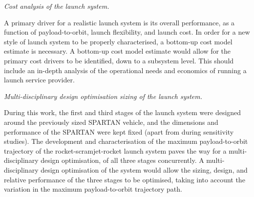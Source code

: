 \vspace{10pt}
 \textit{Cost analysis of the launch system.}

 \noindent
A primary driver for a realistic launch system is its overall performance, as a function of payload-to-orbit, launch flexibility, and launch cost. In order for a new style of launch system to be properly characterised, a bottom-up cost model estimate is necessary. A bottom-up cost model estimate would allow for the primary cost drivers to be identified, down to a subsystem level. This should include an in-depth analysis of the operational needs and economics of running a launch service provider.

\vspace{10pt}
 \textit{Multi-disciplinary design optimisation sizing of the launch system.}

 \noindent
During this work, the first and third stages of the launch system were designed around the previously sized SPARTAN vehicle, and the dimensions and performance of the SPARTAN were kept fixed (apart from during sensitivity studies).
The development and characterisation of the maximum payload-to-orbit trajectory of the rocket-scramjet-rocket launch system paves the way for a multi-disciplinary design optimisation, of all three stages concurrently. A multi-disciplinary design optimisation of the system would allow the sizing, design, and relative performance of the three stages to be optimised, taking into account the variation in the maximum payload-to-orbit trajectory path.  






